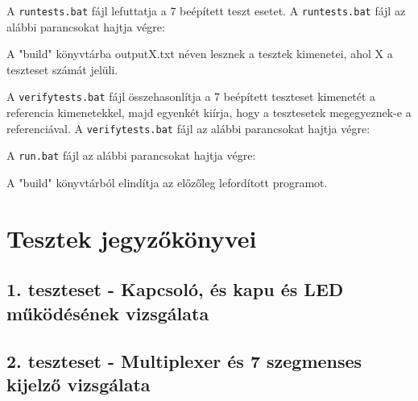 A \texttt{runtests.bat} fájl lefuttatja a 7 beépített teszt esetet.
A \texttt{runtests.bat} fájl az alábbi parancsokat hajtja végre:

A "build" könyvtárba outputX.txt néven lesznek a tesztek kimenetei, ahol X a teszteset számát jelüli.

A \texttt{verifytests.bat} fájl összehasonlítja a 7 beépített teszteset kimenetét a referencia kimenetekkel, majd egyenkét kiírja, hogy a tesztesetek megegyeznek-e a referenciával.
A \texttt{verifytests.bat} fájl az alábbi parancsokat hajtja végre:



A \texttt{run.bat} fájl az alábbi parancsokat hajtja végre:

A "build" könyvtárból elindítja az előzőleg lefordított programot.


\newpage

\section{Tesztek jegyzőkönyvei}

\subsection{1. teszteset - Kapcsoló, és kapu és LED működésének vizsgálata}

\subsection{2. teszteset - Multiplexer és 7 szegmenses kijelző vizsgálata}

